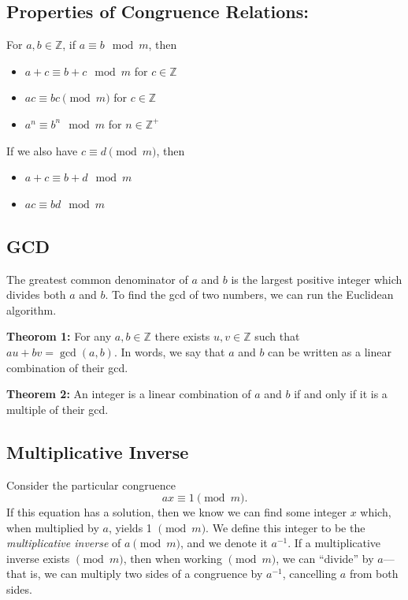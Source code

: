 \documentclass[12pt,letterpaper]{article}
\newcommand\Z{\mathbb Z}
\begin{document}
    

\subsection{Properties of Congruence Relations:}

For $a,b \in \Z$, if $a \equiv b \mod{m}$, then
\begin{itemize}
    \item $a + c\equiv b + c\mod{m}$ for $c \in \mathbb{Z}$
    \item $ac \equiv bc \pmod{m}$ for $c \in \mathbb{Z}$
    \item $a^n \equiv b^n \mod{m}$ for $n \in \mathbb{Z^+}$
\end{itemize}
If we also have $c \equiv d \pmod{m}$, then
\begin{itemize}
    \item $a + c\equiv b + d\mod{m}$
    \item $ac\equiv bd\mod{m}$
\end{itemize}

\subsection{GCD}

The greatest common denominator of $a$ and $b$ is the largest positive integer which divides both $a$ and $b$. To find the gcd of two numbers, we can run the Euclidean algorithm.

\textbf{Theorom 1:} For any $a,b \in \Z$ there exists $u,v \in \Z$ such that $au + bv = \gcd(a,b)$. In words, we say that $a$ and $b$ can be written as a linear combination of their gcd.

\textbf{Theorem 2:} An integer is a linear combination of $a$ and $b$ if and only if it is a multiple of their gcd.

\subsection{Multiplicative Inverse}
Consider the particular congruence
\[
ax \equiv 1 \pmod{m}.
\]
If this equation has a solution, then we know we can find some integer $x$ which, when multiplied by $a$, yields 1 $\pmod{m}$. We define this integer to be the \textit{multiplicative inverse} of $a \pmod{m}$, and we denote it $a^{-1}$. If a multiplicative inverse exists $\pmod{m}$, then when working $\pmod{m}$, we can ``divide'' by $a$---that is, we can multiply two sides of a congruence by $a^{-1}$, cancelling $a$ from both sides.
\end{document}
